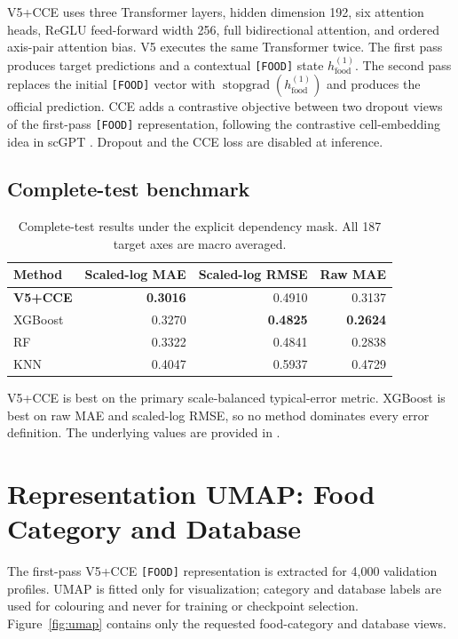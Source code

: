 \documentclass[11pt]{article}
\newcommand{\foodtoken}{\texttt{[FOOD]}}
\begin{document}
V5+CCE uses three Transformer layers, hidden dimension 192, six attention heads, ReGLU feed-forward width 256, full bidirectional attention, and ordered axis-pair attention bias. V5 executes the same Transformer twice. The first pass produces target predictions and a contextual \foodtoken{} state $h_{\mathrm{food}}^{(1)}$. The second pass replaces the initial \foodtoken{} vector with $\operatorname{stopgrad}(h_{\mathrm{food}}^{(1)})$ and produces the official prediction. CCE adds a contrastive objective between two dropout views of the first-pass \foodtoken{} representation, following the contrastive cell-embedding idea in scGPT \cite{scgpt}. Dropout and the CCE loss are disabled at inference.

\subsection{Complete-test benchmark}

\begin{table}[H]
\centering
\caption{Complete-test results under the explicit dependency mask. All 187 target axes are macro averaged.}
\label{tab:complete}
\begin{tabular}{@{}lrrr@{}}
\toprule
Method & Scaled-log MAE & Scaled-log RMSE & Raw MAE \\
\midrule
\textbf{V5+CCE} & \textbf{0.3016} & 0.4910 & 0.3137 \\
XGBoost & 0.3270 & \textbf{0.4825} & \textbf{0.2624} \\
RF & 0.3322 & 0.4841 & 0.2838 \\
KNN & 0.4047 & 0.5937 & 0.4729 \\
\bottomrule
\end{tabular}
\end{table}

V5+CCE is best on the primary scale-balanced typical-error metric. XGBoost is best on raw MAE and scaled-log RMSE, so no method dominates every error definition. The underlying values are provided in .

\section{Representation UMAP: Food Category and Database}

The first-pass V5+CCE \foodtoken{} representation is extracted for 4,000 validation profiles. UMAP \cite{umap} is fitted only for visualization; category and database labels are used for colouring and never for training or checkpoint selection. Figure~\ref{fig:umap} contains only the requested food-category and database views.
\end{document}
